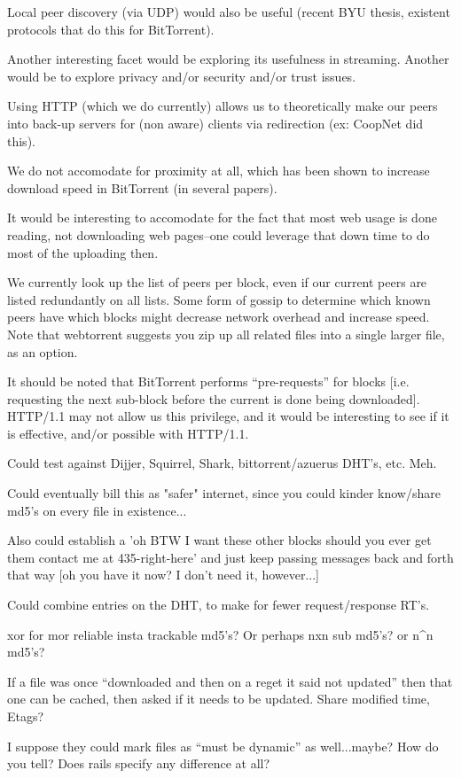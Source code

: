 Local peer discovery (via UDP) would also be useful (recent BYU thesis, existent protocols that do this for BitTorrent).

Another interesting facet would be exploring its usefulness in streaming.  Another would be to explore privacy and/or security and/or trust issues.

Using HTTP (which we do currently) allows us to theoretically make our peers into back-up servers for (non aware) clients via redirection (ex: CoopNet did this).

We do not accomodate for proximity at all, which has been shown to increase download speed in BitTorrent (in several papers).

It would be interesting to accomodate for the fact that most web usage is done reading, not downloading web pages--one could leverage that down time to do most of the uploading then.

We currently look up the list of peers per block, even if our current peers are listed redundantly on all lists.  Some form of gossip to determine which known peers have which blocks might decrease network overhead and increase speed.  Note that webtorrent suggests you zip up all related files into a single larger file, as an option.

It should be noted that BitTorrent performs ``pre-requests'' for blocks [i.e. requesting the next sub-block before the current is done being downloaded].   HTTP/1.1 may not allow us this privilege, and it would be interesting to see if it is effective, and/or possible with HTTP/1.1.

Could test against Dijjer, Squirrel, Shark,  bittorrent/azuerus DHT's, etc. Meh.

Could eventually bill this as "safer" internet, since you could kinder know/share md5's on every file in existence...

Also could establish a 'oh BTW I want these other blocks should you
ever get them contact me at 435-right-here' and just keep passing
messages back and forth that way [oh you have it now? I don't need it,
however...]

Could combine entries on the DHT, to make for fewer request/response RT's.

xor for mor reliable insta trackable md5's? Or perhaps nxn sub md5's? or n^n md5's?

If a file was once ``downloaded and then on a reget it said not updated'' then that one can be cached, then asked if it needs to be updated.  Share modified time, Etags?

I suppose they could mark files as ``must be dynamic'' as well...maybe?  How do you tell?  Does rails specify any difference at all?

